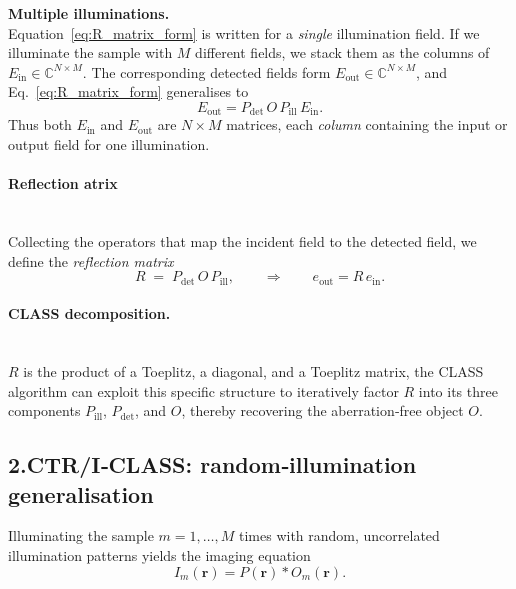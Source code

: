 \documentclass[12pt]{article}
\begin{document}
\noindent\textbf{Multiple illuminations.}~\\
Equation~\eqref{eq:R_matrix_form} is written for a \emph{single}
illumination field.  If we illuminate the sample with $M$ different fields,
we stack them as the columns of
\(E_{\text{in}}\in\mathbb{C}^{N\times M}\).
The corresponding detected fields form
\(E_{\text{out}}\in\mathbb{C}^{N\times M}\),
and Eq.~\eqref{eq:R_matrix_form} generalises to
\[
E_{\text{out}} = P_{\text{det}}\,O\,P_{\text{ill}}\,E_{\text{in}}.
\]
Thus both $E_{\text{in}}$ and $E_{\text{out}}$ are $N\times M$ matrices,
each \emph{column} containing the input or output field for one
illumination.
\paragraph{Reflection atrix}~\\
Collecting the operators that map the incident field to the detected field,
we define the \emph{reflection matrix}
\begin{equation}
R \;=\; P_{\text{det}}\,
        O\,
        P_{\text{ill}},
\qquad\Longrightarrow\qquad
e_{\text{out}} = R\,e_{\text{in}}.
\label{eq:R_def}
\end{equation}
\paragraph{CLASS decomposition.}~\\
\(R\) is the product of a Toeplitz, a diagonal, and a Toeplitz matrix,
the CLASS algorithm can exploit this specific structure to iteratively
factor \(R\) into its three components \(P_{\text{ill}}\), \(P_{\text{det}}\),
and \(O\), thereby recovering the aberration‑free object $O$.

\subsection{2.\quad CTR/I‑CLASS: random‑illumination generalisation}
\label{subsec:ctr_class}

Illuminating the sample $m=1,\dots,M$ times with random, uncorrelated
illumination patterns yields the imaging equation
\begin{equation}
I_{m}(\mathbf r)
  = P(\mathbf r)\ast O_{m}(\mathbf r).
\label{imaging_eq}
\end{equation}
\end{document}
